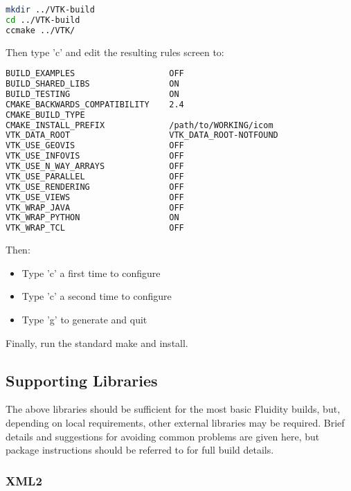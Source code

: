 \begin{lstlisting}[language=bash]
mkdir ../VTK-build
cd ../VTK-build
ccmake ../VTK/
\end{lstlisting}

Then type 'c' and edit the resulting rules screen to:

\begin{lstlisting}[language=bash]
BUILD_EXAMPLES                   OFF
BUILD_SHARED_LIBS                ON                                     
BUILD_TESTING                    ON
CMAKE_BACKWARDS_COMPATIBILITY    2.4
CMAKE_BUILD_TYPE
CMAKE_INSTALL_PREFIX             /path/to/WORKING/icom          
VTK_DATA_ROOT                    VTK_DATA_ROOT-NOTFOUND
VTK_USE_GEOVIS                   OFF                                    
VTK_USE_INFOVIS                  OFF                                    
VTK_USE_N_WAY_ARRAYS             OFF
VTK_USE_PARALLEL                 OFF
VTK_USE_RENDERING                OFF                                    
VTK_USE_VIEWS                    OFF                                    
VTK_WRAP_JAVA                    OFF
VTK_WRAP_PYTHON                  ON                                     
VTK_WRAP_TCL                     OFF
\end{lstlisting}

Then:

\begin{itemize}
  \item Type 'c' a first time to configure
  \item Type 'c' a second time to configure
  \item Type 'g' to generate and quit
\end{itemize}

Finally, run the standard make and install.

\subsection{Supporting Libraries}
\label{sect:required_libraries_supporting}

The above libraries should be sufficient for the most basic Fluidity builds,
but, depending on local requirements, other external libraries may be required.
Brief details and suggestions for avoiding common problems are given here, but
package instructions should be referred to for full build details.

\subsubsection{XML2}
\label{sect:required_libraries_supporting_xml2}

